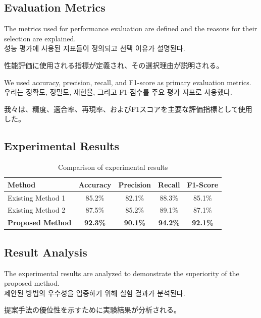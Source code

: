 \documentclass[12pt,a4paper]{article}
\begin{document}
\subsection{Evaluation Metrics}
The metrics used for performance evaluation are defined and the reasons for their selection are explained. \\
성능 평가에 사용된 지표들이 정의되고 선택 이유가 설명된다. \\
\begin{CJK}{UTF8}{min}
性能評価に使用される指標が定義され、その選択理由が説明される。
\end{CJK}

We used accuracy, precision, recall, and F1-score as primary evaluation metrics. \\
우리는 정확도, 정밀도, 재현율, 그리고 F1-점수를 주요 평가 지표로 사용했다. \\
\begin{CJK}{UTF8}{min}
我々は、精度、適合率、再現率、およびF1スコアを主要な評価指標として使用した。
\end{CJK}

\subsection{Experimental Results}
\begin{table}[htbp]
\centering
\caption{Comparison of experimental results}
\label{tab:results}
\begin{tabular}{@{}lcccc@{}}
\toprule
Method & Accuracy & Precision & Recall & F1-Score \\
\midrule
Existing Method 1 & 85.2\% & 82.1\% & 88.3\% & 85.1\% \\
Existing Method 2 & 87.5\% & 85.2\% & 89.1\% & 87.1\% \\
\textbf{Proposed Method} & \textbf{92.3\%} & \textbf{90.1\%} & \textbf{94.2\%} & \textbf{92.1\%} \\
\bottomrule
\end{tabular}
\end{table}

\subsection{Result Analysis}
The experimental results are analyzed to demonstrate the superiority of the proposed method. \\
제안된 방법의 우수성을 입증하기 위해 실험 결과가 분석된다. \\
\begin{CJK}{UTF8}{min}
提案手法の優位性を示すために実験結果が分析される。
\end{CJK}
\end{document}
